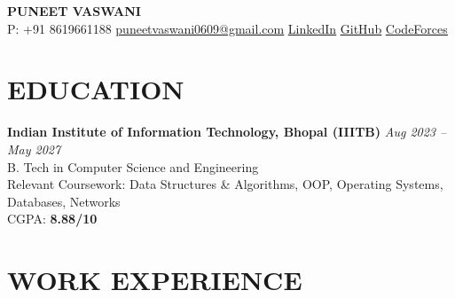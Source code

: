 \documentclass[a4paper,10pt]{article}
\newcommand{\ulhref}[2]{\href{#1}{\uline{#2}}}
\begin{document}
\begin{center}
    {\LARGE \textbf{PUNEET VASWANI}} \\[4pt]
    P: +91 8619661188 \quad \textbar \quad 
    \ulhref{mailto:puneetvaswani0609@gmail.com}{puneetvaswani0609@gmail.com} \quad \textbar \quad
    \ulhref{https://linkedin.com/in/puneet-v-171885310/}{LinkedIn} \quad \textbar \quad
    \ulhref{https://github.com/PunVas}{GitHub} \quad \textbar \quad
    \ulhref{https://codeforces.com/profile/0x0609PVLfa}{CodeForces}
\end{center}

\section*{EDUCATION}
\textbf{Indian Institute of Information Technology, Bhopal (IIITB)} \hfill \textit{Aug 2023 -- May 2027} \\
B. Tech in Computer Science and Engineering \\
Relevant Coursework: Data Structures \& Algorithms, OOP, Operating Systems, Databases, Networks \\
CGPA: \textbf{8.88/10}

\section*{WORK EXPERIENCE}
\end{document}
